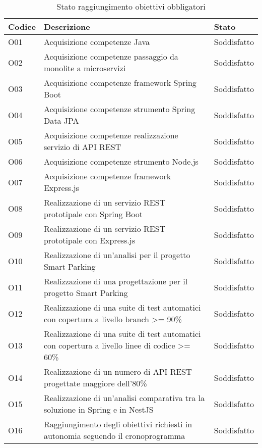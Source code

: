 \begin{table}[H]
    \begin{tabular}{|p{1.5cm}|p{7.7cm}|p{2cm}|} 
    \hline
    \textbf{Codice} & \textbf{Descrizione} & \textbf{Stato} \\ 
    \hline
    O01 & Acquisizione competenze Java & Soddisfatto \\
    \hline
    O02 & Acquisizione competenze passaggio da monolite a microservizi & Soddisfatto \\
    \hline
    O03 & Acquisizione competenze framework Spring Boot & Soddisfatto \\
    \hline
    O04 & Acquisizione competenze strumento Spring Data JPA & Soddisfatto \\
    \hline
    O05 & Acquisizione competenze realizzazione servizio di \gls{API} \gls{REST} & Soddisfatto \\
    \hline
    O06 & Acquisizione competenze strumento Node.js & Soddisfatto \\
    \hline
    O07 & Acquisizione competenze framework Express.js & Soddisfatto \\
    \hline
    O08 & Realizzazione di un servizio \gls{REST} prototipale con Spring Boot & Soddisfatto \\
    \hline
    O09 & Realizzazione di un servizio \gls{REST} prototipale con Express.js & Soddisfatto \\
    \hline
    O10 & Realizzazione di un'analisi per il progetto Smart Parking & Soddisfatto \\
    \hline
    O11 & Realizzazione di una progettazione per il progetto Smart Parking & Soddisfatto \\
    \hline
    O12 & Realizzazione di una suite di test automatici con copertura a livello branch >= 90\% & Soddisfatto \\
    \hline
    O13 & Realizzazione di una suite di test automatici con copertura a livello linee di codice >= 60\% & Soddisfatto \\
    \hline
    O14 & Realizzazione di un numero di \gls{API} \gls{REST} progettate maggiore dell'80\% & Soddisfatto \\
    \hline
    O15 & Realizzazione di un'analisi comparativa tra la soluzione in Spring e in NestJS & Soddisfatto \\
    \hline
    O16 & Raggiungimento degli obiettivi richiesti in autonomia seguendo il cronoprogramma & Soddisfatto \\
    \hline
    \end{tabular}
    \caption{Stato raggiungimento obiettivi obbligatori}
\end{table}
